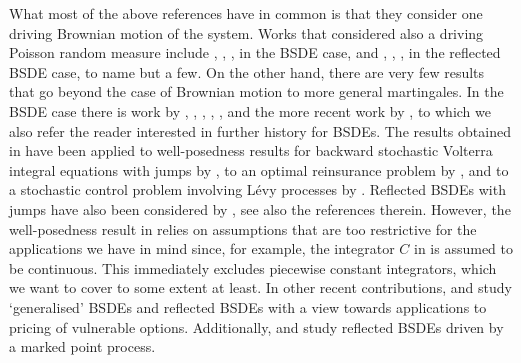 \documentclass[10pt]{article} %
\newcommand{\1}{\mathbf{1}}
\begin{document}
\medskip
What most of the above references have in common is that they consider one driving Brownian motion of the system. Works that considered also a driving Poisson random measure include \citeauthor*{barles1997backward} \cite{barles1997backward}, \citeauthor*{royer2006backward} \cite{royer2006backward}, \citeauthor*{quenez2013bsdes} \cite{quenez2013bsdes}, \citeauthor*{becherer2019monotone} \cite{becherer2019monotone} in the BSDE case, and \citeauthor*{hamadene2003reflected} \cite{hamadene2003reflected}, \citeauthor*{crepey2008reflected} \cite{crepey2008reflected}, \citeauthor*{quenez2014reflected} \cite{quenez2014reflected}, \citeauthor*{perninge2023optimal} \cite{perninge2023optimal,perninge2024optimal} in the reflected BSDE case, to name but a few. On the other hand, there are very few results that go beyond the case of Brownian motion to more general martingales. In the BSDE case there is work by \citeauthor*{buckdahn1993backward} \cite{buckdahn1993backward}, \citeauthor*{elkaroui1997general} \cite{elkaroui1997general}, \citeauthor*{carbone2008backward} \cite{carbone2008backward}, \citeauthor*{confortola2014backward} \cite{confortola2014backward}, \citeauthor*{bandini2015existence} \cite{bandini2015existence}, \citeauthor*{cohen2012existence} \cite{cohen2012existence} and the more recent work by \citeauthor*{papapantoleon2018existence} \cite{papapantoleon2018existence}, to which we also refer the reader interested in further history for BSDEs. The results obtained in \cite{papapantoleon2018existence} have been applied to well-posedness results for backward stochastic Volterra integral equations with jumps by \citeauthor*{popier2021backward} \cite{popier2021backward}, to an optimal reinsurance problem by \citeauthor*{brachetta2022optimal} \cite{brachetta2022optimal}, and to a stochastic control problem involving Lévy processes by \citeauthor*{dinunno2022stochastic} \cite{dinunno2022stochastic}. Reflected BSDEs with jumps have also been considered by \citeauthor*{nie2022reflected} \cite{nie2022reflected}, see also the references therein. However, the well-posedness result in \cite{nie2022reflected} relies on assumptions that are too restrictive for the applications we have in mind since, for example, the integrator $C$ in \cite{nie2022reflected} is assumed to be continuous. This immediately excludes piecewise constant integrators, which we want to cover to some extent at least. In other recent contributions, \citeauthor*{aksamit2023generalized} \cite{aksamit2023generalized} and \citeauthor*{li2022well} \cite{li2022well} study `generalised' BSDEs and reflected BSDEs with a view towards applications to pricing of vulnerable options. Additionally, \citeauthor*{gu2023mean} \cite{gu2023mean,gu2023reflected} and \citeauthor*{lin2024mean} \cite{lin2024mean} study reflected BSDEs driven by a marked point process.
\end{document}
